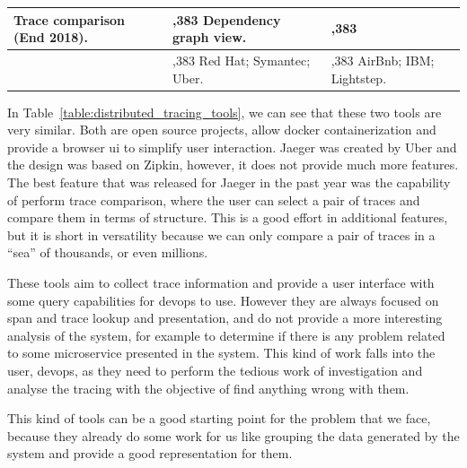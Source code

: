\begin{table}[]
\begin{tabularx}{\linewidth} {
            >{\hsize=0.234\hsize}X|
            >{\hsize=0,383\hsize}X|
            >{\hsize=0,383\hsize}X|}
        Trace comparison (End 2018).
         & Dependency graph view.                                                                                                                                                                                       \\ \hline
        \multicolumn{1}{|l|}{\textbf{Used by}}
         & Red Hat; \newline
        Symantec; \newline
        Uber. \newline
         & AirBnb; \newline
        IBM; \newline
        Lightstep.                                                                                                                                                                                                      \\ \hline
    \end{tabularx}
\end{table}

In Table~\ref{table:distributed_tracing_tools}, we can see that these two tools are very similar. Both are open source projects, allow docker containerization and provide a browser ui to simplify user interaction. Jaeger was created by Uber and the design was based on Zipkin, however, it does not provide much more features. The best feature that was released for Jaeger in the past year was the capability of perform trace comparison, where the user can select a pair of traces and compare them in terms of structure. This is a good effort in additional features, but it is short in versatility because we can only compare a pair of traces in a ``sea'' of thousands, or even millions.

These tools aim to collect trace information and provide a user interface with some query capabilities for \gls{devops} to use. However they are always focused on span and trace lookup and presentation, and do not provide a more interesting analysis of the system, for example to determine if there is any problem related to some microservice presented in the system. This kind of work falls into the user, \gls{devops}, as they need to perform the tedious work of investigation and analyse the tracing with the objective of find anything wrong with them.

This kind of tools can be a good starting point for the problem that we face, because they already do some work for us like grouping the data generated by the system and provide a good representation for them.

